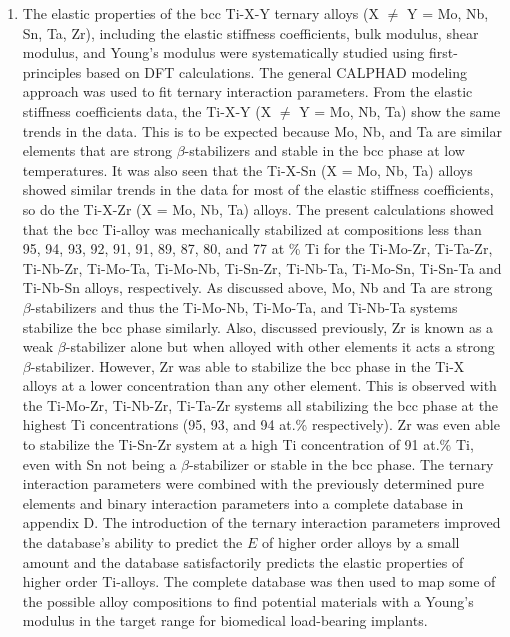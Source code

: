 \begin{enumerate}
	\item The elastic properties of the bcc Ti-X-Y ternary alloys (X $\neq$ Y = Mo, Nb, Sn, Ta, Zr), including the elastic stiffness coefficients, bulk modulus, shear modulus, and Young's modulus were systematically studied using first-principles based on DFT calculations. The general CALPHAD modeling approach was used to fit ternary interaction parameters. From the elastic stiffness coefficients data, the Ti-X-Y (X $\neq$ Y = Mo, Nb, Ta) show the same trends in the data. This is to be expected because Mo, Nb, and Ta are similar elements that are strong $\beta$-stabilizers and stable in the bcc phase at low temperatures. It was also seen that the Ti-X-Sn (X = Mo, Nb, Ta) alloys showed similar trends in the data for most of the elastic stiffness coefficients, so do the Ti-X-Zr (X = Mo, Nb, Ta) alloys. The present calculations showed that the bcc Ti-alloy was mechanically stabilized at compositions less than 95, 94, 93, 92, 91, 91, 89, 87, 80, and 77 at \% Ti for the Ti-Mo-Zr, Ti-Ta-Zr, Ti-Nb-Zr, Ti-Mo-Ta, Ti-Mo-Nb, Ti-Sn-Zr, Ti-Nb-Ta, Ti-Mo-Sn, Ti-Sn-Ta and Ti-Nb-Sn alloys, respectively. As discussed above, Mo, Nb and Ta are strong $\beta$-stabilizers and thus the Ti-Mo-Nb, Ti-Mo-Ta, and Ti-Nb-Ta systems stabilize the bcc phase similarly. Also, discussed previously, Zr is known as a weak $\beta$-stabilizer alone but when alloyed with other elements it acts a strong $\beta$-stabilizer. However, Zr was able to stabilize the bcc phase in the Ti-X alloys at a lower concentration than any other element. This is observed with the Ti-Mo-Zr, Ti-Nb-Zr, Ti-Ta-Zr systems all stabilizing the bcc phase at the highest Ti concentrations (95, 93, and 94 at.\% respectively). Zr was even able to stabilize the Ti-Sn-Zr system at a high Ti concentration of 91 at.\% Ti, even with Sn not being a $\beta$-stabilizer or stable in the bcc phase. The ternary interaction parameters were combined with the previously determined pure elements and binary interaction parameters into a complete database in appendix D. The introduction of the ternary interaction parameters improved the database's ability to predict the $E$ of higher order alloys by a small amount and the database satisfactorily predicts the elastic properties of higher order Ti-alloys. The complete database was then used to map some of the possible alloy compositions to find potential materials with a Young's modulus in the target range for biomedical load-bearing implants. 

\end{enumerate}
